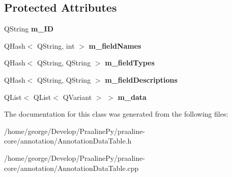 \subsection*{Protected Attributes}
\begin{DoxyCompactItemize}
\item 
\mbox{\label{class_annotation_data_table_a37114464f331a0b7e5b6563efd1d00d1}} 
Q\+String {\bfseries m\+\_\+\+ID}
\item 
\mbox{\label{class_annotation_data_table_acd1274d7181c721cb2fa6be4b3d479dc}} 
Q\+Hash$<$ Q\+String, int $>$ {\bfseries m\+\_\+field\+Names}
\item 
\mbox{\label{class_annotation_data_table_a6d9245d23b68a6f3f8caa32a8d29acf3}} 
Q\+Hash$<$ Q\+String, Q\+String $>$ {\bfseries m\+\_\+field\+Types}
\item 
\mbox{\label{class_annotation_data_table_a984a95fc42d98a02f272404676105b2f}} 
Q\+Hash$<$ Q\+String, Q\+String $>$ {\bfseries m\+\_\+field\+Descriptions}
\item 
\mbox{\label{class_annotation_data_table_aa69e33213d49a794b875c56e6335e5bd}} 
Q\+List$<$ Q\+List$<$ Q\+Variant $>$ $>$ {\bfseries m\+\_\+data}
\end{DoxyCompactItemize}


The documentation for this class was generated from the following files\+:\begin{DoxyCompactItemize}
\item 
/home/george/\+Develop/\+Praaline\+Py/praaline-\/core/annotation/Annotation\+Data\+Table.\+h\item 
/home/george/\+Develop/\+Praaline\+Py/praaline-\/core/annotation/Annotation\+Data\+Table.\+cpp\end{DoxyCompactItemize}
